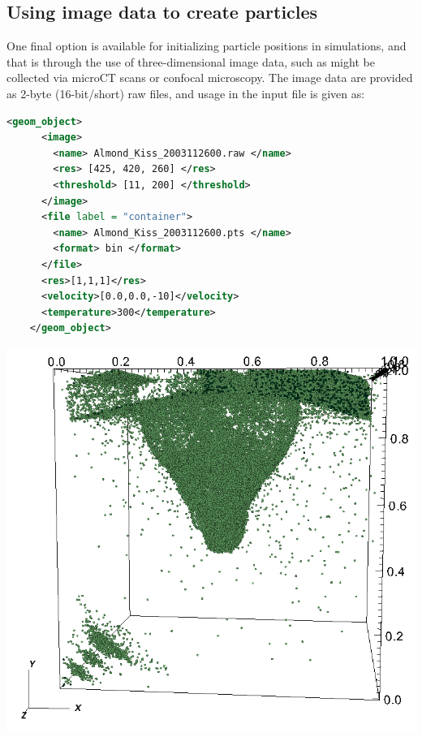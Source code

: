 \subsection{Using image data to create particles}
\begin{minipage}[t]{0.6\textwidth}
  \vspace{0pt}
  One final option is available for initializing particle positions in \MPM
  simulations, and that is through the use of three-dimensional image data,
  such as might be collected via microCT scans or confocal microscopy.  The image data are 
  provided as 2-byte (16-bit/short) raw files, and usage in the input file is given as:
  \begin{lstlisting}[language=XML]
    <geom_object>
      <image>
        <name> Almond_Kiss_2003112600.raw </name>
        <res> [425, 420, 260] </res>
        <threshold> [11, 200] </threshold>
      </image>
      <file label = "container">
        <name> Almond_Kiss_2003112600.pts </name>
        <format> bin </format>
      </file>
      <res>[1,1,1]</res>
      <velocity>[0.0,0.0,-10]</velocity>
      <temperature>300</temperature>
    </geom_object>
  \end{lstlisting}
\end{minipage}
\hspace{12pt}
\begin{minipage}[t]{0.35\textwidth}
  \vspace{0pt}
  \centering
  \includegraphics[width=0.9\columnwidth]{FIGS/geometry/geom_image.png}
\end{minipage}

